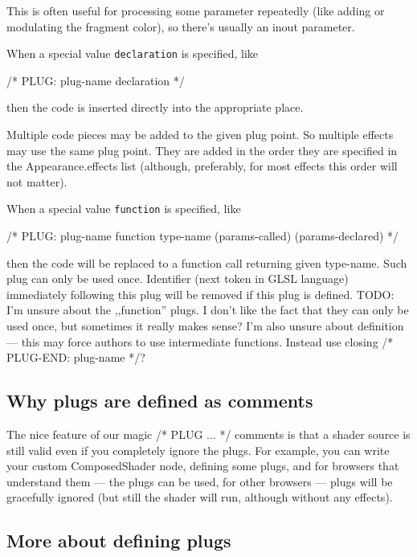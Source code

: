 \documentclass{acmsiggraph}                     %
\newenvironment{mycode}
{\begin{mycodecore}}
{\end{mycodecore}
\vspace{-0.1in}}
\begin{document}
This is often useful for processing some parameter
repeatedly (like adding or modulating the fragment color),
so there's usually an inout parameter.

When a special value \texttt{declaration} is specified, like

\begin{mycode}
/* PLUG: plug-name declaration */
\end{mycode}

then the code is inserted directly into the appropriate place.

Multiple code pieces may be added to the given plug point.
So multiple effects may use the same plug point. They are added
in the order they are specified in the Appearance.effects list
(although, preferably, for most effects this order will not matter).

When a special value \texttt{function} is specified, like

\begin{mycode}
/* PLUG: plug-name function type-name (params-called) (params-declared) */
\end{mycode}

then the code will be replaced to a function call returning given type-name.
Such plug can only be used once.
Identifier (next token in GLSL language) immediately following
this plug will be removed if this plug is defined.
TODO: I'm unsure about the ,,function'' plugs.
I don't like the fact that they can only be used once, but sometimes
it really makes sense?
I'm also unsure about definition --- this may force authors to use
intermediate functions. Instead use closing /* PLUG-END: plug-name */?

\subsection{Why plugs are defined as comments}

The nice feature of our magic /* PLUG ... */ comments is that a shader source
is still valid even if you completely ignore the plugs. For example,
you can write your custom ComposedShader node, defining some plugs,
and for browsers that understand them --- the plugs can be used,
for other browsers --- plugs will be gracefully ignored (but still
the shader will run, although without any effects).

\subsection{More about defining plugs}
\end{document}

